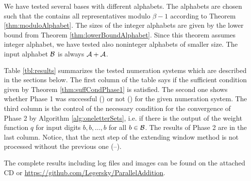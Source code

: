 We have tested several bases with different alphabets. The alphabets are chosen such that the contains all representatives modulo $\beta-1$ according to Theorem \ref{thm:moduloAlphabet}. The sizes of the integer alphabets are given by the lower bound from Theorem \ref{thm:lowerBoundAlphabet}. Since this theorem assumes integer alphabet, we have tested also noninteger alphabets of smaller size. The input alphabet $\mathcal{B}$ is always $\mathcal{A}+ \mathcal{A}$.  

 Table \ref{tbl:results} summarizes the tested numeration systems which are described in the sections below. The first column of the table says if the sufficient condition given by Theorem \ref{thm:suffCondPhase1} is satisfied. The second one shows whether Phase 1 was successful (\checkmark) or not (\xmark) for the given numeration system. The third column is the control of the necessary condition for the convergence of Phase 2 by Algorithm \ref{alg:oneletterSets}, i.e. if there is the output of the weight function $q$ for input digits $b,b,\dots,b$ for all $b\in\mathcal{B}$. The results of Phase 2 are in the last column. Notice, that the next step of the extending window method is not processed without the previous one (--).

The complete results including log files and images can be found on the attached CD  or \url{https://github.com/Legersky/ParallelAddition}.

